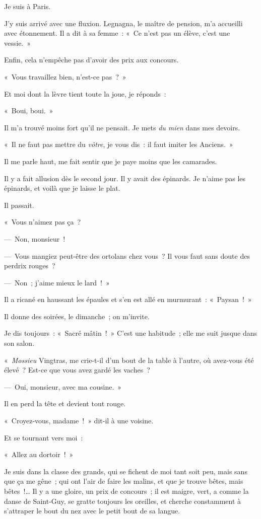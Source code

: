 \documentclass[french,twoside]{book} %
\begin{document}
\noindent Je suis à Paris.\par
J’y suis arrivé avec une fluxion. Legnagna, le maître de pension, m’a accueilli avec étonnement. Il a dit à sa femme : « Ce n’est pas un élève, c’est une vessie. »\par
Enfin, cela n’empêche pas d’avoir des prix aux concours.\par
« Vous travaillez bien, n’est-ce pas ? »\par
Et moi dont la lèvre tient toute la joue, je réponds :\par
« Boui, boui. »\par
Il m’a trouvé moins fort qu’il ne pensait. Je mets \emph{du mien} dans mes devoirs.\par
« Il ne faut pas mettre du \emph{vôtre}, je vous dis : il faut imiter les Anciens. »\par
Il me parle haut, me fait sentir que je paye moins que les camarades.\par
Il y a fait allusion dès le second jour. Il y avait des épinards. Je n’aime pas les épinards, et voilà que je laisse le plat.\par
Il passait.\par
« Vous n’aimez pas ça ?\par
— Non, monsieur !\par
— Vous mangiez peut-être des ortolans chez vous ? Il vous faut sans doute des perdrix rouges ?\par
— Non ; j’aime mieux le lard ! »\par
Il a ricané en haussant les épaules et s’en est allé en murmurant : « Paysan ! »\par
\bigbreak
\noindent Il donne des soirées, le dimanche ; on m’invite.\par
Je dis toujours : « Sacré mâtin ! » C’est une habitude ; elle me suit jusque dans son salon.\par
« \emph{Mossieu} Vingtras, me crie-t-il d’un bout de la table à l’autre, où avez-vous été élevé ? Est-ce que vous avez gardé les vaches ?\par
— Oui, monsieur, avec ma cousine. »\par
Il en perd la tête et devient tout rouge.\par
« Croyez-vous, madame ! » dit-il à une voisine.\par
Et se tournant vers moi :\par
« Allez au dortoir ! »\par
\bigbreak
\noindent Je suis dans la classe des grands, qui se fichent de moi tant soit peu, mais sans que ça me gêne ; qui ont l’air de faire les malins, et que je trouve bêtes, mais bêtes !… Il y a une gloire, un prix de concours ; il est maigre, vert, a comme la danse de Saint-Guy, se gratte toujours les oreilles, et cherche constamment à s’attraper le bout du nez avec le petit bout de sa langue.\par
\end{document}
